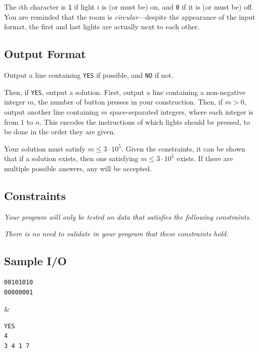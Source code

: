The $i$th character is \texttt{1} if light $i$ is (or must be) on, and \texttt{0} if it is (or must be) off.  You are reminded that the room is \textit{circular}---despite the appearance of the input format, the first and last lights are actually next to each other.

\subsection*{Output Format}

Output a line containing \texttt{YES} if possible, and \texttt{NO} if not.

Then, if \texttt{YES}, output a solution.  First, output a line containing a non-negative integer $m$, the number of button presses in your construction.  Then, if $m > 0$, output another line containing $m$ space-separated integers, where each integer is from $1$ to $n$.  This encodes the instructions of which lights should be pressed, to be done in the order they are given.

Your solution must satisfy $m \leq 3 \cdot 10^5$.  Given the constraints, it can be shown that if a solution exists, then one satisfying $m \leq 3 \cdot 10^5$ exists.  If there are multiple possible answers, any will be accepted.

\newpage

\subsection*{Constraints}

\textit{Your program will only be tested on data that satisfies the following constraints.}


\textit{There is no need to validate in your program that these constraints hold.}

\subsection*{Sample I/O}

\begin{sampleIO}
\begin{verbatim}
00101010
00000001
\end{verbatim}
&
\begin{verbatim}
YES
4
3 4 1 7
\end{verbatim}
\end{sampleIO}

